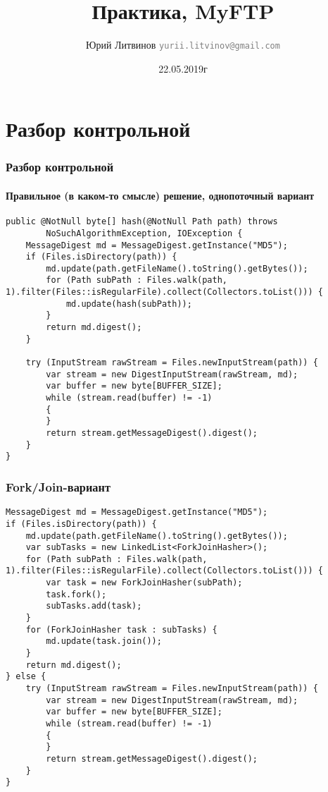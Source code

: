 \documentclass[xetex,mathserif,serif]{beamer}
\title{Практика, MyFTP}
\author[Юрий Литвинов]{Юрий Литвинов \newline \textcolor{gray}{\small\texttt{yurii.litvinov@gmail.com}}}
\date{22.05.2019г}
\begin{document}
	
	\frame{\titlepage}
	
	\section{Разбор контрольной}

	\begin{frame}[fragile]
		\frametitle{Разбор контрольной}
		\framesubtitle{Правильное (в каком-то смысле) решение, однопоточный вариант}
		\begin{scriptsize}
			\begin{verbatim}
public @NotNull byte[] hash(@NotNull Path path) throws 
        NoSuchAlgorithmException, IOException {
    MessageDigest md = MessageDigest.getInstance("MD5");
    if (Files.isDirectory(path)) {
        md.update(path.getFileName().toString().getBytes());
        for (Path subPath : Files.walk(path, 1).filter(Files::isRegularFile).collect(Collectors.toList())) {
            md.update(hash(subPath));
        }
        return md.digest();
    }

    try (InputStream rawStream = Files.newInputStream(path)) {
        var stream = new DigestInputStream(rawStream, md);
        var buffer = new byte[BUFFER_SIZE];
        while (stream.read(buffer) != -1)
        {
        }
        return stream.getMessageDigest().digest();
    }
}
			\end{verbatim}
		\end{scriptsize}
\end{frame}

	\begin{frame}[fragile]
		\frametitle{Fork/Join-вариант}
		\begin{scriptsize}
			\begin{verbatim}
MessageDigest md = MessageDigest.getInstance("MD5");
if (Files.isDirectory(path)) {
    md.update(path.getFileName().toString().getBytes());
    var subTasks = new LinkedList<ForkJoinHasher>();
    for (Path subPath : Files.walk(path, 1).filter(Files::isRegularFile).collect(Collectors.toList())) {
        var task = new ForkJoinHasher(subPath);
        task.fork();
        subTasks.add(task);
    }
    for (ForkJoinHasher task : subTasks) {
        md.update(task.join());
    }
    return md.digest();
} else {
    try (InputStream rawStream = Files.newInputStream(path)) {
        var stream = new DigestInputStream(rawStream, md);
        var buffer = new byte[BUFFER_SIZE];
        while (stream.read(buffer) != -1)
        {
        }
        return stream.getMessageDigest().digest();
    }
}
			\end{verbatim}
		\end{scriptsize}
	\end{frame}
\end{document}
